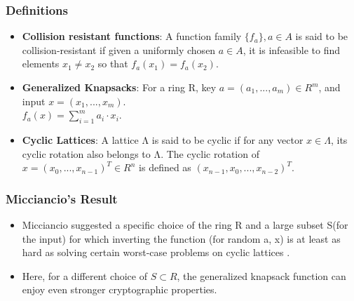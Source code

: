 \documentclass{beamer}
\begin{document}
\begin{frame}
	\frametitle{Definitions}
	\begin{itemize}
		\item \textbf{Collision resistant functions}: A function family $\{f_a\}, a \in A$ is said to be collision-resistant if given a uniformly chosen $a \in A$, it is infeasible to find elements $x_1 \neq x_2$ so that $f_a(x_1) = f_a(x_2)$.
		\item \textbf{Generalized Knapsacks}: For a ring R, key $a = (a_1 , . . . , a_m) \in R^m$, and input $x = (x_1 , . . . , x_m)$.
		\\
		$f_a(x) = \sum_{i=1}^{m}a_i·x_i$. 
		\item \textbf{Cyclic Lattices}: A lattice Λ is said to be cyclic if for any
		vector $x \in Λ$, its cyclic rotation also belongs to Λ. The cyclic rotation of $x = (x_0 , . . . , x_{n−1})^T \in R^n$ is defined as $(x_{n-1}, x_0, . . . , x_{n-2})^T$.
	\end{itemize}
\end{frame}

\begin{frame}
\frametitle{Micciancio's Result}
\begin{itemize}
\item Micciancio suggested a specific choice of the ring R and a large subset S(for the input) for which inverting the function (for random a, x) is at least as hard as solving certain worst-case problems on cyclic lattices \cite{Micciancio:2002:GCK:645413.652130}.
\item Here, for a different choice of $S \subset R$, the generalized knapsack function can enjoy even stronger
cryptographic properties.
\end{itemize}
\end{frame}
\end{document}
